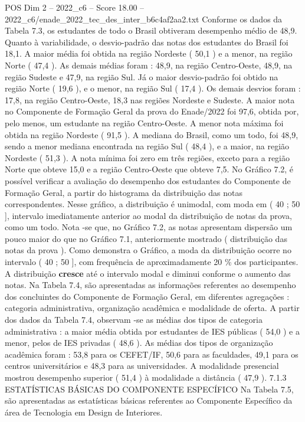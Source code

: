 \begin{textsample}{POS Dim 2 – 2022\_c6 – Score 18.00 – 2022\_c6/enade\_2022\_tec\_des\_inter\_b6c4af2aa2.txt}
Conforme os dados da Tabela 7.3, os estudantes de todo o Brasil obtiveram desempenho médio de 48,9.
Quanto à variabilidade, o desvio-padrão das notas dos estudantes do Brasil foi 18,1.
A maior média foi obtida na região Nordeste ( 50,1 ) e a menor, na região Norte ( 47,4 ).
As demais médias foram : 48,9, na região Centro-Oeste, 48,9, na região Sudeste e 47,9, na região Sul.
Já o maior desvio-padrão foi obtido na região Norte ( 19,6 ), e o menor, na região Sul ( 17,4 ).
Os demais desvios foram : 17,8, na região Centro-Oeste, 18,3 nas regiões Nordeste e Sudeste.
A maior nota no Componente de Formação Geral da prova do Enade/2022 foi 97,6, obtida por, pelo menos, um estudante na região Centro-Oeste.
A menor nota máxima foi obtida na região Nordeste ( 91,5 ).
A mediana do Brasil, como um todo, foi 48,9, sendo a menor mediana encontrada na região Sul ( 48,4 ), e a maior, na região Nordeste ( 51,3 ).
A nota mínima foi zero em três regiões, exceto para a região Norte que obteve 15,0 e a região Centro-Oeste que obteve 7,5.
No Gráfico 7.2, é possível verificar a avaliação do desempenho dos estudantes do Componente de Formação Geral, a partir do histograma da distribuição das notas correspondentes.
Nesse gráfico, a distribuição é unimodal, com moda em ( 40 ; 50 ], intervalo imediatamente anterior ao modal da distribuição de notas da prova, como um todo.
Nota -se que, no Gráfico 7.2, as notas apresentam dispersão um pouco maior do que no Gráfico 7.1, anteriormente mostrado ( distribuição das notas da prova ).
Como demonstra o Gráfico, a moda da distribuição ocorre no intervalo ( 40 ; 50 ], com frequência de aproximadamente 20 \% dos participantes.
A distribuição \textbf{cresce} até o intervalo modal e diminui conforme o aumento das notas.
Na Tabela 7.4, são apresentadas as informações referentes ao desempenho dos concluintes do Componente de Formação Geral, em diferentes agregações : categoria administrativa, organização acadêmica e modalidade de oferta.
A partir dos dados da Tabela 7.4, observam -se as médias dos tipos de categoria administrativa : a maior média obtida por estudantes de IES públicas ( 54,0 ) e a menor, pelos de IES privadas ( 48,6 ).
As médias dos tipos de organização acadêmica foram : 53,8 para os CEFET/IF, 50,6 para as faculdades, 49,1 para os centros universitários e 48,3 para as universidades.
A modalidade presencial mostrou desempenho superior ( 51,4 ) à modalidade a distância ( 47,9 ). 7.1.3 ESTATÍSTICAS BÁSICAS DO COMPONENTE ESPECÍFICO Na Tabela 7.5, são apresentadas as estatísticas básicas referentes ao Componente Específico da área de Tecnologia em Design de Interiores.

\end{textsample}
